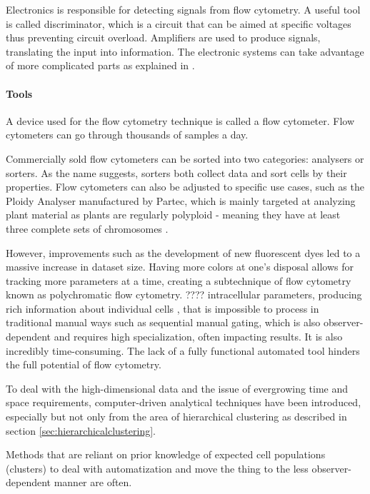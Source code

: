 Electronics is responsible for detecting signals from flow cytometry. A useful tool is called discriminator, which is a circuit that can be aimed at specific voltages thus preventing circuit overload. Amplifiers are used to produce signals, translating the input into information. The electronic systems can take advantage of more complicated parts as explained in \cite{robinson2004flow}.

\paragraph{Tools}
\label{sec:flowtools}
A device used for the flow cytometry technique is called a flow cytometer. Flow cytometers can go through thousands of samples a day.

Commercially sold flow cytometers can be sorted into two categories: analysers or sorters. As the name suggests, sorters both collect data and sort cells by their properties. Flow cytometers can also be adjusted to specific use cases, such as the Ploidy Analyser manufactured by Partec, which is mainly targeted at analyzing plant material as plants are regularly polyploid - meaning they have at least three complete sets of chromosomes \citep{zhang2003genetic, jacob1998pollen, geng2011genetic}. 

However, improvements such as the development of new fluorescent dyes led to a massive increase in dataset size. Having more colors at one's disposal allows for tracking more parameters at a time, creating a subtechnique of flow cytometry known as polychromatic flow cytometry. ???? intracellular parameters, producing rich information about individual cells \citep{wood20069}, that is impossible to process in traditional manual ways such as sequential manual gating, which is also observer-dependent and requires high specialization, often impacting results. It is also incredibly time-consuming. The lack of a fully functional automated tool hinders the full potential of flow cytometry. 

To deal with the high-dimensional data and the issue of evergrowing time and space requirements, computer-driven analytical techniques have been introduced, especially but not only from the area of hierarchical clustering as described in section \ref{sec:hierarchicalclustering}.

Methods that are reliant on prior knowledge of expected cell populations (clusters) \citep{lo2008automated, rogers2008cytometric, wilkins2001comparison, zeng2007feature} to deal with automatization and move the thing to the less observer-dependent manner are often. 

